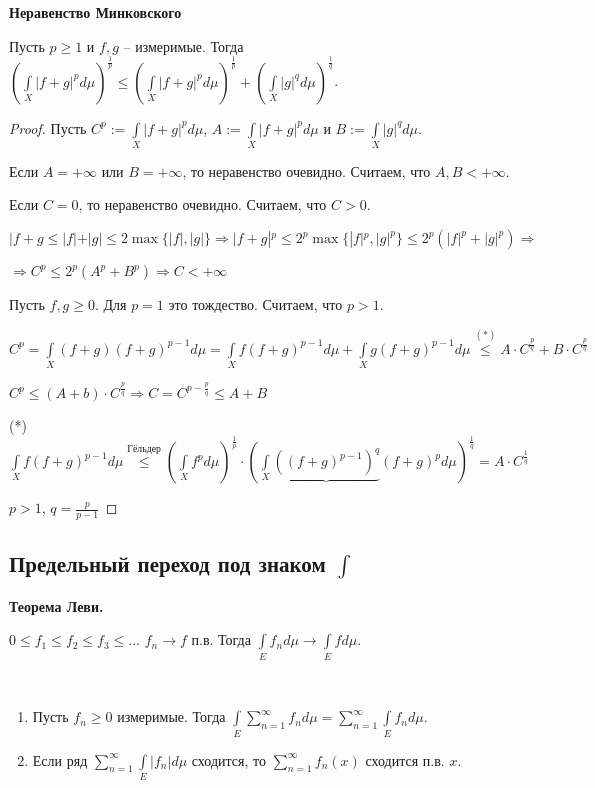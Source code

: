 \begin{theorem}
    \textbf{Неравенство Минковского}

    Пусть $p \geq 1$ и $f, g$ – измеримые. Тогда 
    $(\int\limits_X |f+g|^pd\mu)^{\frac{1}{p}}\leq (\int\limits_X |f+g|^pd\mu)^{\frac{1}{p}} + (\int\limits_X |g|^q d\mu)^\frac{1}{q}$.
\end{theorem}

\begin{proof}
    Пусть $C^p := \int\limits_X |f+g|^pd\mu$, $A:=\int\limits_X |f+g|^pd\mu$ и $B:=\int\limits_X |g|^q d\mu$.

    Если $A=+\infty$ или $B=+\infty$, то неравенство очевидно. Считаем, что $A, B< +\infty$.

    Если $C=0$, то неравенство очевидно. Считаем, что $C>0$.

    $|f+g\leq |f|+|g|\leq 2 \max\{|f|,|g|\}\Rightarrow |f+g|^p\leq 2^p \max\{|f|^p, |g|^p\}\leq 
    2^p (|f|^p + |g|^p)\Rightarrow$

    $\Rightarrow C^p \leq 2^p (A^p + B^p)\Rightarrow C<+\infty$

    Пусть $f, g\geq 0$. Для $p=1$ это тождество. Считаем, что $p>1$.

    $C^p = \int\limits_X (f+g)(f+g)^{p-1} d\mu = \int\limits_X f(f+g)^{p-1} d\mu+
    \int\limits_X g(f+g)^{p-1} d\mu \overset{(*)}{\leq} A\cdot C^{\frac{p}{q}}+B\cdot C^{\frac{p}{q}}$

    $C^p \leq (A+b)\cdot C^{\frac{p}{q}}\Rightarrow C = C ^{p-\frac{p}{q}}\leq A + B$
    

    (*) $\int\limits_X f(f+g)^{p-1} d\mu \overset{\text{Гёльдер}}{\leq}(\int\limits_X f^p d\mu)^{\frac{1}{p}}
    \cdot (\int\limits_X \underbrace{((f+g)^{p-1})^q}{(f+g)^p} d\mu)^{\frac{1}{q}}=A\cdot C^{\frac{1}{q}}$

    $p>1$, $q=\frac{p}{p-1}$
\end{proof}

\subsection{Предельный переход под знаком $\int$}

\begin{theorem}
    \textbf{Теорема Леви.}

    $0\leq f_1\leq f_2\leq f_3\leq \dots$ $f_n\rightarrow f$ п.в.
     Тогда $\int\limits_E f_n d\mu \rightarrow\int\limits_E f d\mu$.
\end{theorem}

\begin{corollary}~
    \begin{enumerate}
        \item Пусть $f_n\geq 0$ измеримые. Тогда $\int\limits_E \sum\limits_{n=1}^\infty f_n d\mu=\sum\limits_{n=1}^\infty\int\limits_E f_n d\mu$.
        
        \item Если ряд $\sum\limits_{n=1}^\infty\int\limits_E |f_n| d\mu$ сходится, то $\sum\limits_{n=1}^\infty f_n(x)$ сходится п.в. $x$.
    \end{enumerate}
\end{corollary}

